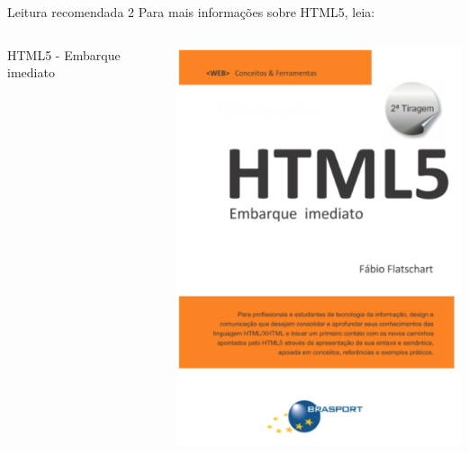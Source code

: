 \documentclass{beamer}
\begin{document}
\begin{frame}{Leitura recomendada 2}
 Para mais informações sobre HTML5, leia:\\
 \begin{columns}
   \begin{column}{0.4\textwidth}
     HTML5 - Embarque imediato\\ 
      \cite{flatschart2011html}
   \end{column}
   \begin{column}{0.3\textwidth}
    \begin{center}
  \includegraphics[height=0.5\paperheight]{fig/aula2/flatschart2014html.png} \\
 \end{center}
   \end{column}
 \end{columns}
\end{frame}

\end{document}
